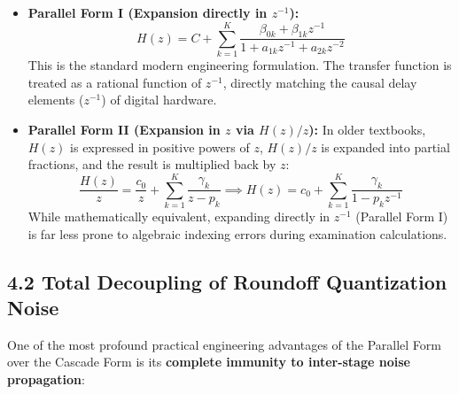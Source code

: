 \documentclass[11pt,a4paper]{article}
\begin{document}
\begin{itemize}
    \item \textbf{Parallel Form I (Expansion directly in $z^{-1}$):}
    \begin{equation}
    H(z) = C + \sum_{k=1}^K \frac{\beta_{0k} + \beta_{1k} z^{-1}}{1 + a_{1k} z^{-1} + a_{2k} z^{-2}}
    \end{equation}
    This is the standard modern engineering formulation. The transfer function is treated as a rational function of $z^{-1}$, directly matching the causal delay elements ($z^{-1}$) of digital hardware.
    
    \item \textbf{Parallel Form II (Expansion in $z$ via $H(z)/z$):}
    In older textbooks, $H(z)$ is expressed in positive powers of $z$, $H(z)/z$ is expanded into partial fractions, and the result is multiplied back by $z$:
    \begin{equation}
    \frac{H(z)}{z} = \frac{c_0}{z} + \sum_{k=1}^K \frac{\gamma_k}{z - p_k} \implies H(z) = c_0 + \sum_{k=1}^K \frac{\gamma_k}{1 - p_k z^{-1}}
    \end{equation}
    While mathematically equivalent, expanding directly in $z^{-1}$ (Parallel Form I) is far less prone to algebraic indexing errors during examination calculations.
\end{itemize}

\subsection{4.2 Total Decoupling of Roundoff Quantization Noise}
One of the most profound practical engineering advantages of the Parallel Form over the Cascade Form is its \textbf{complete immunity to inter-stage noise propagation}:
\end{document}

